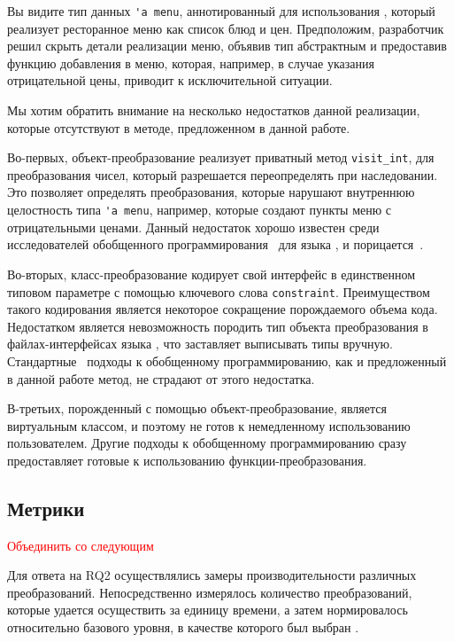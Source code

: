 \noindent Вы видите тип данных \lstinline{'a menu}, аннотированный для использования \visitors{}, который реализует ресторанное меню как список блюд и цен. Предположим, разработчик решил скрыть детали реализации меню, объявив тип абстрактным и предоставив функцию добавления в меню, которая, например, в случае указания отрицательной цены, приводит к исключительной ситуации.

Мы хотим обратить внимание на несколько недостатков данной реализации, которые отсутствуют в методе, предложенном в данной работе.

Во-первых, объект-преобразование реализует приватный метод \lstinline{visit_int}, для преобразования чисел, который разрешается переопределять при наследовании. Это позволяет определять преобразования, которые нарушают внутреннюю целостность типа \lstinline{'a menu}, например, которые создают пункты меню с отрицательными ценами. Данный недостаток хорошо известен среди исследователей обобщенного программирования~\cite{SYB} для языка \haskell{}, и порицается~\cite{SafeHaskell}.

Во-вторых, класс-преобразование кодирует свой интерфейс в единственном типовом параметре с помощью ключевого слова \lstinline{constraint}. Преимуществом такого кодирования является некоторое сокращение порождаемого объема кода. Недостатком является невозможность породить тип объекта преобразования в файлах-интерфейсах языка \OCaml{}, что заставляет выписывать типы вручную. Стандартные~\cite{ppxderiving} подходы к обобщенному программированию, как и предложенный в данной работе метод, не страдают от этого недостатка.

В-третьих, порожденный с помощью \visitors{} объект-преобразование, является виртуальным классом, и поэтому не готов к немедленному использованию пользователем. Другие подходы к обобщенному программированию сразу предоставляет готовые к использованию функции-преобразования.

\subsection{Метрики}

\textcolor{red}{Объединить со следующим}

Для ответа на RQ2 осуществлялись замеры производительности различных преобразований. Непосредственно измерялось количество преобразований, которые удается осуществить за единицу времени, а затем нормировалось относительно базового уровня, в качестве которого был выбран \GT{}.

